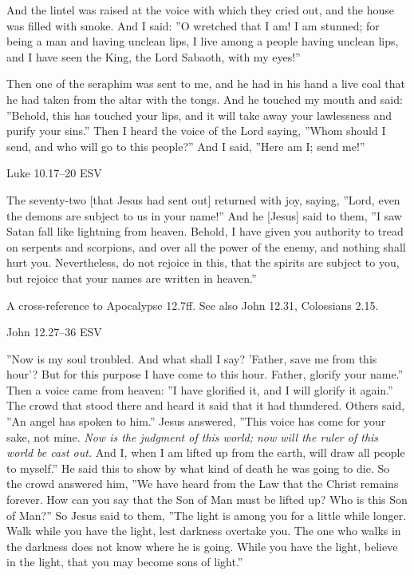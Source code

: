 \documentclass[
]{article}
\newcommand{\RL}[1]{\beginR #1\endR}
\begin{document}
And the lintel was raised at the voice with which they cried out, and
the house was filled with smoke. And I said: \RL{''}O wretched that I
am! I am stunned; for being a man and having unclean lips, I live among
a people having unclean lips, and I have seen the King, the Lord
Sabaoth, with my eyes!''

Then one of the seraphim was sent to me, and he had in his hand a live
coal that he had taken from the altar with the tongs. And he touched my
mouth and said: \RL{''}Behold, this has touched your lips, and it will
take away your lawlessness and purify your sins.'' Then I heard the
voice of the Lord saying, \RL{''}Whom should I send, and who will go to
this people?'' And I said, \RL{''}Here am I; send me!''

Luke 10.17--20 ESV

The seventy-two {[}that Jesus had sent out{]} returned with joy, saying,
\RL{''}Lord, even the demons are subject to us in your name!'' And he
{[}Jesus{]} said to them, \RL{''}I saw Satan fall like lightning from
heaven. Behold, I have given you authority to tread on serpents and
scorpions, and over all the power of the enemy, and nothing shall hurt
you. Nevertheless, do not rejoice in this, that the spirits are subject
to you, but rejoice that your names are written in heaven.''

A cross-reference to Apocalypse 12.7ff. See also John 12.31, Colossians
2.15.

John 12.27--36 ESV

\RL{''}Now is my soul troubled. And what shall I say? \RL{'}Father, save
me from this hour\RL{'}? But for this purpose I have come to this hour.
Father, glorify your name.'' Then a voice came from heaven: \RL{''}I
have glorified it, and I will glorify it again.'' The crowd that stood
there and heard it said that it had thundered. Others said, \RL{''}An
angel has spoken to him.'' Jesus answered, \RL{''}This voice has come
for your sake, not mine. \emph{Now is the judgment of this world; now
will the ruler of this world be cast out.} And I, when I am lifted up
from the earth, will draw all people to myself.'' He said this to show
by what kind of death he was going to die. So the crowd answered him,
\RL{''}We have heard from the Law that the Christ remains forever. How
can you say that the Son of Man must be lifted up? Who is this Son of
Man?'' So Jesus said to them, \RL{''}The light is among you for a little
while longer. Walk while you have the light, lest darkness overtake you.
The one who walks in the darkness does not know where he is going. While
you have the light, believe in the light, that you may become sons of
light.''
\end{document}
